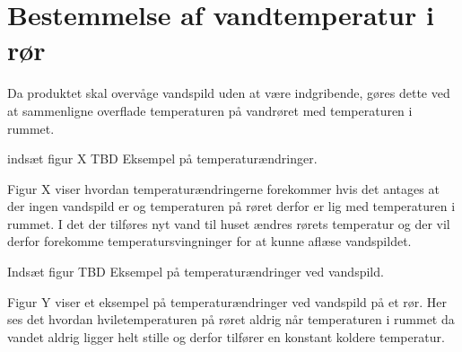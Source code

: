 \section{Bestemmelse af vandtemperatur i rør}
Da produktet skal overvåge vandspild uden at være indgribende, gøres dette ved at sammenligne overflade temperaturen på vandrøret med temperaturen i rummet. 


indsæt figur X TBD
Eksempel på temperaturændringer.

Figur X viser hvordan temperaturændringerne forekommer hvis det antages at der ingen vandspild er og temperaturen på røret derfor er lig med temperaturen i rummet. I det der tilføres nyt vand til huset ændres rørets temperatur og der vil derfor forekomme temperatursvingninger for at kunne aflæse vandspildet.





Indsæt figur TBD
Eksempel på temperaturændringer ved vandspild.

Figur Y viser et eksempel på temperaturændringer ved vandspild på et rør. Her ses det hvordan hviletemperaturen på røret aldrig når temperaturen i rummet da vandet aldrig ligger helt stille og derfor tilfører en konstant koldere temperatur.  



    